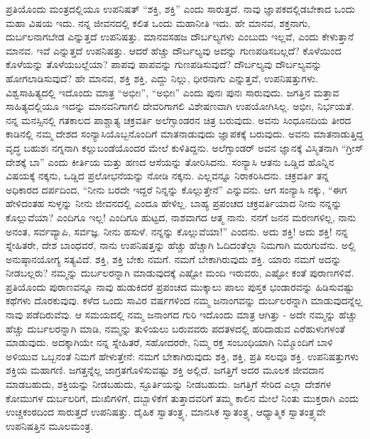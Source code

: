 ಪ್ರತಿಯೊಂದು ಮಂತ್ರದಲ್ಲಿಯೂ ಉಪನಿಷತ್​ “ಶಕ್ತಿ, ಶಕ್ತಿ” ಎಂದು ಸಾರುತ್ತದೆ. ನಾವು ಜ್ಞಾಪಕದಲ್ಲಿಡಬೇಕಾದ ಒಂದು ಮಹಾ ವಿಷಯ ಇದು. ನನ್ನ ಜೀವನದಲ್ಲಿ ಕಲಿತ ಒಂದು ಮಹಾನೀತಿ ಇದು. ಹೇ ಮಾನವ, ಶಕ್ತನಾಗು, ದುರ್ಬಲನಾಗಬೇಡ ಎನ್ನುತ್ತದೆ ಉಪನಿಷತ್ತು. ಮಾನವಸಹಜ ದೌರ್ಬಲ್ಯಗಳು ಎಂಬುದು ಇಲ್ಲವೆ, ಎಂದು ಕೇಳುತ್ತಾನೆ ಮಾನವ. ಇವೆ ಎನ್ನುತ್ತದೆ ಉಪನಿಷತ್ತು. ಆದರೆ ಹೆಚ್ಚು ದೌರ್ಬಲ್ಯವು ಅದನ್ನು ಗುಣಪಡಿಸಬಲ್ಲದೆ? ಕೊಳೆಯಿಂದ ಕೊಳೆಯನ್ನು ತೊಳೆಯಬಲ್ಲೆಯಾ? ಪಾಪವು ಪಾಪವನ್ನು ಗುಣಪಡಿಸುವುದೆ? ದೌರ್ಬಲ್ಯವು ದೌರ್ಬಲ್ಯವನ್ನು ಹೋಗಲಾಡಿಸುವುದೆ? ಹೇ ಮಾನವ, ಶಕ್ತಿ ಶಕ್ತಿ, ಎದ್ದು ನಿಲ್ಲು, ಧೀರನಾಗು ಎನ್ನುತ್ತವೆ, ಉಪನಿಷತ್ತುಗಳು. ವಿಶ್ವಸಾಹಿತ್ಯದಲ್ಲಿ ಇದೊಂದು ಮಾತ್ರ “ಅಭೀಃ”, “ಅಭೀಃ” ಎಂದು ಪುನಃ ಪುನಃ ಸಾರುವುದು. ಜಗತ್ತಿನ ಮತ್ತಾವ ಸಾಹಿತ್ಯದಲ್ಲಿಯೂ ಇದನ್ನು ಮಾನವನಿಗಾಗಲಿ ದೇವರಿಗಾಗಲಿ ವಿಶೇಷಣವಾಗಿ ಉಪಯೋಗಿಸಿಲ್ಲ. ಅಭೀಃ, ನಿರ್ಭಯತೆ. ನನ್ನ ಮನಸ್ಸಿನಲ್ಲಿ ಗತಕಾಲದ ಪಾಶ್ಚಾತ್ಯ ಚಕ್ರವರ್ತಿ ಅಲೆಗ್ಸಾಂಡರನ ಚಿತ್ರ ಬರುವುದು. ಅವನು ಸಿಂಧೂನದಿಯ ತೀರದ ಕಾಡಿನಲ್ಲಿ ನಮ್ಮ ದೇಶದ ಸಂನ್ಯಾಸಿಯೊಬ್ಬನೊಂದಿಗೆ ಮಾತನಾಡುವುದು ಜ್ಞಾಪಕಕ್ಕೆ ಬರುವುದು. ಅವನು ಮಾತನಾಡುತ್ತಿದ್ದ ವೃದ್ಧ ಬಹುಶಃ ನಗ್ನನಾಗಿ ಕಲ್ಲುಬಂಡೆಯೊಂದರ ಮೇಲೆ ಕುಳಿತಿದ್ದನು. ಅಲೆಗ್ಸಾಂಡರ್​ ಅವನ ಜ್ಞಾನಕ್ಕೆ ವಿಸ್ಮಿತನಾಗಿ “ಗ್ರೀಸ್​ ದೇಶಕ್ಕೆ ಬಾ” ಎಂದು ಕೀರ್ತಿಯ ಮತ್ತು ಹಣದ ಆಸೆಯನ್ನು ತೋರಿಸಿದನು. ಸಂನ್ಯಾಸಿ ಆತನು ಒಡ್ಡಿದ ಹೊನ್ನಿನ ವಿಷಯಕ್ಕೆ ನಕ್ಕನು, ಒಡ್ಡಿದ ಪ್ರಲೋಭನೆಯನ್ನು ನೋಡಿ ನಕ್ಕನು. ಎಲ್ಲವನ್ನೂ ನಿರಾಕರಿಸಿದನು. ಚಕ್ರವರ್ತಿ ತನ್ನ ಅಧಿಕಾರದ ದರ್ಪದಿಂದ, “ನೀನು ಬರದೇ ಇದ್ದರೆ ನಿನ್ನನ್ನು ಕೊಲ್ಲುತ್ತೇನೆ” ಎನ್ನುವನು. ಆಗ ಸಂನ್ಯಾಸಿ ನಕ್ಕು, “ಈಗ ಹೇಳಿದಂತಹ ಸುಳ್ಳನ್ನು ನೀನು ಜೀವನದಲ್ಲಿ ಎಂದೂ ಹೇಳಿಲ್ಲ. ಬಾಹ್ಯ ಪ್ರಪಂಚದ ಚಕ್ರವರ್ತಿಯಾದ ನೀನು ನನ್ನನ್ನು ಕೊಲ್ಲುವೆಯಾ? ಎಂದಿಗೂ ಇಲ್ಲ! ಎಂದಿಗೂ ಹುಟ್ಟದ, ನಾಶವಾಗದ ಆತ್ಮ ನಾನು. ನನಗೆ ಜನನ ಮರಣಗಳಿಲ್ಲ, ನಾನು ಅನಂತ, ಸರ್ವವ್ಯಾಪಿ, ಸರ್ವಜ್ಞ. ನೀನು ಹಸುಳೆ. ನನ್ನನ್ನು ಕೊಲ್ಲುವೆಯಾ!” ಎಂದನು. ಅದು ಶಕ್ತಿ! ಅದು ಶಕ್ತಿ! ನನ್ನ ಸ್ನೇಹಿತರೇ, ದೇಶ ಬಾಂಧವರೆ, ನಾನು ಉಪನಿಷತ್ತನ್ನು ಹೆಚ್ಚು ಹೆಚ್ಚಾಗಿ ಓದಿದಂತೆಲ್ಲಾ ನಿಮಗಾಗಿ ಮರುಗುವೆನು. ಅಲ್ಲಿ ಅನುಷ್ಠಾನಯೋಗ್ಯ ಸತ್ಯವಿದೆ. ಶಕ್ತಿ, ಶಕ್ತಿ ಬೇಕು ನಮಗೆ. ನಮಗೆ ಬೇಕಾಗಿರುವುದು ಶಕ್ತಿ. ಯಾರು ನಮಗೆ ಅದನ್ನು ನೀಡಬಲ್ಲರು? ನಮ್ಮನ್ನು ದುರ್ಬಲರನ್ನಾಗಿ ಮಾಡುವುದಕ್ಕೆ ಎಷ್ಟೋ ಮಂದಿ ಇರುವರು, ಎಷ್ಟೋ ಕಂತೆ ಪುರಾಣಗಳಿವೆ. ಪ್ರತಿಯೊಂದು ಪುರಾಣವನ್ನೂ ನಾವು ಹುಡುಕಿದರೆ ಪ್ರಪಂಚದ ಮುಕ್ಕಾಲು ಪಾಲು ಪುಸ್ತಕ ಭಂಡಾರವನ್ನು ಹಿಡಿಸುವಷ್ಟು ಕಥೆಗಳು ದೊರಕುವುವು. ಕಳೆದ ಒಂದು ಸಾವಿರ ವರ್ಷಗಳಿಂದ ನಮ್ಮ ಜನಾಂಗವನ್ನು ದುರ್ಬಲರನ್ನಾಗಿ ಮಾಡುವುದನ್ನೆಲ್ಲ ನಾವು ಪಡೆದಿರುವೆವು. ಆ ಸಮಯದಲ್ಲಿ ನಮ್ಮ ಜನಾಂಗದ ಗುರಿ ಇದೊಂದು ಮಾತ್ರ ಆಗಿತ್ತು - ಅದೇ ನಮ್ಮನ್ನು ಹೆಚ್ಚು ಹೆಚ್ಚು ದುರ್ಬಲರನ್ನಾಗಿ ಮಾಡಿ, ನಮ್ಮನ್ನು ತುಳಿಯಲು ಬರುವವರು ಪದತಳದಲ್ಲಿ ಹರಿದಾಡುವ ಎರೆಹುಳುಗಳಂತೆ ಮಾಡುವುದು. ಅದಕ್ಕಾಗಿಯೇ ನನ್ನ ಸ್ನೇಹಿತರೆ, ಸಹೋದರರೇ, ನಿಮ್ಮ ರಕ್ತ ಸಂಬಂಧಿಯಾಗಿ ನಿಮ್ಮೊಂದಿಗೆ ಬಾಳಿ ಅಳಿಯುವ ಒಬ್ಬನಂತೆ ನಿಮಗೆ ಹೇಳುತ್ತೇನೆ: ನಮಗೆ ಬೇಕಾಗಿರುವುದು ಶಕ್ತಿ, ಶಕ್ತಿ, ಪ್ರತಿ ಸಲವೂ ಶಕ್ತಿ. ಉಪನಿಷತ್ತುಗಳು ಶಕ್ತಿಯ ಮಹಾಗಣಿ. ಜಗತ್ತನ್ನೆಲ್ಲ ಜಾಗ್ರತಗೊಳಿಸುವಷ್ಟು ಶಕ್ತಿ ಅಲ್ಲಿದೆ. ಜಗತ್ತಿಗೆ ಅದರ ಮೂಲಕ ಜೀವದಾನ ಮಾಡಬಹುದು, ಶಕ್ತಿಯನ್ನು ನೀಡಬಹುದು, ಸ್ಫೂರ್ತಿಯನ್ನು ನೀಡಬಹುದು. ಜಗತ್ತಿಗೆ ಸೇರಿದ ಎಲ್ಲಾ ದೇಶಗಳ ಕೋಮುಗಳ ದುರ್ಬಲರಿಗೆ, ದುಃಖಿಗಳಿಗೆ, ದಬ್ಬಾಳಿಕೆಗೆ ತುತ್ತಾದವರಿಗೆ ತಮ್ಮ ಕಾಲಿನ ಮೇಲೆ ನಿಂತು ಮುಕ್ತರಾಗಿ ಎಂದು ಉಚ್ಚ\break ಕಂಠದಿಂದ ಸಾರುತ್ತದೆ ಉಪನಿಷತ್ತು. ದೈಹಿಕ ಸ್ವಾತಂತ್ರ್ಯ, ಮಾನಸಿಕ ಸ್ವಾತಂತ್ರ್ಯ, ಆಧ್ಯಾತ್ಮಿಕ ಸ್ವಾತಂತ್ರ್ಯವೇ ಉಪನಿಷತ್ತಿನ ಮೂಲಮಂತ್ರ.

